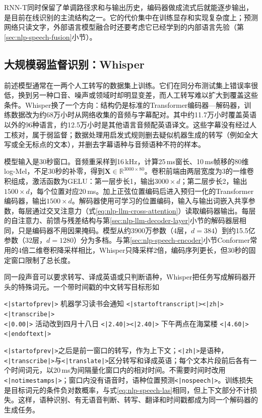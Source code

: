 RNN-T同时保留了单调路径求和与输出历史，编码器做成流式后就能逐步输出，是目前在线识别的主流结构之一。它的代价集中在训练显存和实现复杂度上；预测网络只读文字，外部语言模型融合时还要考虑它已经学到的内部语言先验（第\ref{sec:nlp-speech-fusion}小节）。

\subsection{大规模弱监督识别：Whisper}
\label{sec:nlp-speech-whisper}

前述模型通常在一两个人工转写的数据集上训练。它们在同分布测试集上错误率很低，换到另一种口音、噪声或领域时却明显变差，而人工转写难以扩大到覆盖这些条件。Whisper换了一个方向：结构仍是标准的Transformer编码器—解码器，训练数据改为约68万小时从网络收集的音频与字幕配对。其中约11.7万小时覆盖英语以外的96种语言，约12.5万小时是其他语言音频配英语译文。这些字幕没有经过人工核对，属于弱监督；数据处理用启发式规则删去疑似机器生成的转写（例如全大写或全无标点的文本），并删去字幕语种与音频语种不符的样本。

模型输入是30秒窗口。音频重采样到16\,kHz，计算25\,ms窗长、10\,ms帧移的80维log-Mel，不足30秒的补零，得到$\bm{X}\in\mathbb{R}^{3000\times80}$。卷积前端由两层宽度为3的一维卷积组成，激活函数为GELU：第一层步长1，输出$3000\times d$；第二层步长2，输出$1500\times d$，每个位置对应20\,ms。加上正弦位置编码后进入预归一化的Transformer编码器，输出$1500\times d$。解码器使用可学习的位置编码，输入与输出词嵌入共享参数，每层通过交叉注意力（式\eqref{eq:nlp-llm-cross-attention}）读取编码器输出。每层的自注意力、前馈与残差结构与第\ref{sec:nlp-llm-decoder-layer}小节的解码器层相同，只是编码器不用因果掩码。模型从约3900万参数（4层，$d=384$）到约15.5亿参数（32层，$d=1280$）分为多档。与第\ref{sec:nlp-speech-encoder}小节Conformer常用的4倍二维卷积降采样相比，Whisper只降采样2倍，编码序列更长，但30秒的固定窗口限制了总长度。

同一段声音可以要求转写、译成英语或只判断语种，Whisper把任务写成解码器开头的特殊词元。一个带时间戳的中文转写目标形如
\begin{center}
\small
\texttt{<|startofprev|>} 机器学习读书会通知 \texttt{<|startoftranscript|><|zh|><|transcribe|>}\\
\texttt{<|0.00|>} 活动改到四月十八日 \texttt{<|2.40|><|2.40|>} 下午两点在海棠楼 \texttt{<|4.60|><|endoftext|>}
\end{center}
\texttt{<|startofprev|>}之后是前一窗口的转写，作为上下文；\texttt{<|zh|>}是语种，\texttt{<|transcribe|>}与\texttt{<|translate|>}区分转写和译成英语；每个文本片段前后各有一个时间词元，以20\,ms为间隔量化窗口内的相对时间。不需要时间时改用\texttt{<|notimestamps|>}；窗口内没有语音时，语种位置预测\texttt{<|nospeech|>}。训练损失是目标词元的条件负对数概率，与式\eqref{eq:nlp-speech-las}相同，但上下文部分不计损失。这样，语种识别、有无语音判断、转写、翻译和时间戳都成为同一个解码器的生成任务。

